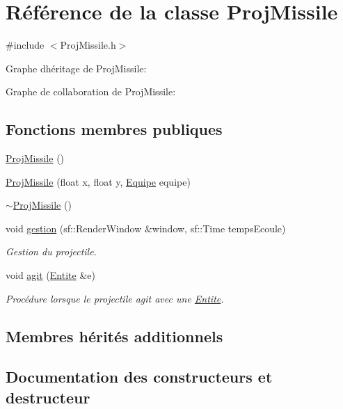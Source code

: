 \hypertarget{class_proj_missile}{}\section{Référence de la classe Proj\+Missile}
\label{class_proj_missile}


{\ttfamily \#include $<$Proj\+Missile.\+h$>$}



Graphe d\textquotesingle{}héritage de Proj\+Missile\+:


Graphe de collaboration de Proj\+Missile\+:
\subsection*{Fonctions membres publiques}
\begin{DoxyCompactItemize}
\item 
\hyperlink{class_proj_missile_ab19da57422266894f8285b77ae1a2369}{Proj\+Missile} ()
\item 
\hyperlink{class_proj_missile_a4351ac217088340ca26d71e986cae860}{Proj\+Missile} (float x, float y, \hyperlink{constantes_8h_a08fa5554288d5031a8f3bb83cc04ee83}{Equipe} equipe)
\item 
\hyperlink{class_proj_missile_adf1e62cc1a0c195b6de72ca7830338c5}{$\sim$\+Proj\+Missile} ()
\item 
void \hyperlink{class_proj_missile_a6e7a2c8180b7275a1d03340229d83bf3}{gestion} (sf\+::\+Render\+Window \&window, sf\+::\+Time temps\+Ecoule)
\begin{DoxyCompactList}\small\item\em Gestion du projectile. \end{DoxyCompactList}\item 
void \hyperlink{class_proj_missile_a8125c442857f7a0fc2d0ff442c39aca7}{agit} (\hyperlink{class_entite}{Entite} \&e)
\begin{DoxyCompactList}\small\item\em Procédure lorsque le projectile agit avec une \hyperlink{class_entite}{Entite}. \end{DoxyCompactList}\end{DoxyCompactItemize}
\subsection*{Membres hérités additionnels}


\subsection{Documentation des constructeurs et destructeur}
\mbox{\label{class_proj_missile_ab19da57422266894f8285b77ae1a2369}} 
